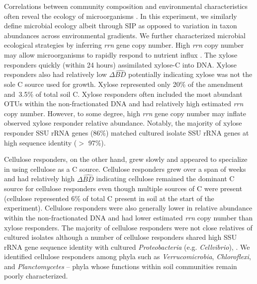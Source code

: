 Correlations between community composition and environmental characteristics
often reveal the ecology of microorganisms \citep{Fierer2007}. In this
experiment, we similarly define microbial ecology albeit through SIP as opposed
to variation in taxon abundances across environmental gradients. We further
characterized microbial ecological strategies by inferring \textit{rrn} gene
copy number. High \textit{rrn} copy number may allow microorganisms to rapidly
respond to nutrient influx \citep{Klappenbach_2000}. The xylose responders
quickly (within 24 hours) assimilated xylose-C into DNA. Xylose responders also
had relatively low $\Delta\hat{BD}$ potentially indicating xylose was not the
sole C source used for growth. Xylose represented only 20\% of the 
amendment and~3.5\% of total soil C. Xylose responders often
included the most abundant OTUs within the non-fractionated DNA and had
relatively high estimated \textit{rrn} copy number. However, to some degree,
high \textit{rrn} gene copy number may inflate observed xylose responder
relative abundance. Notably, the majority of xylose responder SSU rRNA genes
(86\%) matched cultured isolate SSU rRNA genes at high sequence identity ($>$
97\%). 

Cellulose responders, on the other hand, grew slowly and appeared to specialize
in using cellulose as a C source. Cellulose responders grew over a span of weeks
and had relatively high $\Delta\hat{BD}$ indicating cellulose remained the
dominant C source for cellulose responders even though multiple sources of
C were present (cellulose represented 6\% of total C present in soil at the
start of the experiment). Cellulose responders were also generally lower in
relative abundance within the non-fractionated DNA and had lower estimated
\textit{rrn} copy number than xylose responders. The majority of cellulose
responders were not close relatives of cultured isolates although a number of
cellulose responders shared high SSU rRNA gene sequence identity with cultured
\textit{Proteobacteria} (e.g. \textit{Cellvibrio}), . We identified cellulose
responders among phyla such as \textit{Verrucomicrobia}, \textit{Chloroflexi},
and \textit{Planctomycetes} -- phyla whose functions within soil communities
remain poorly characterized.

